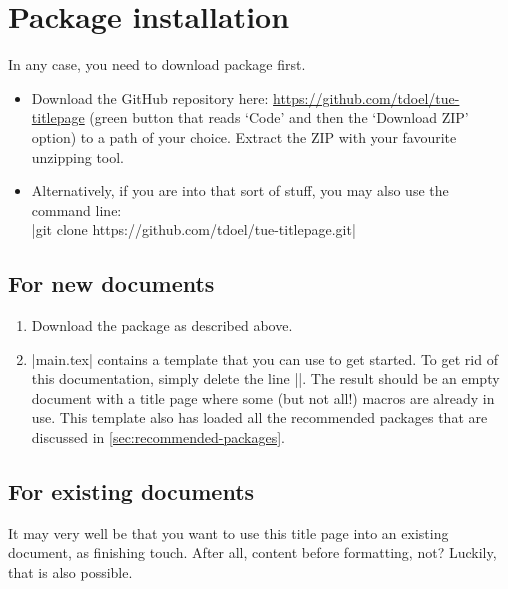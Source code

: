 \section{Package installation}
In any case, you need to download package first.
\begin{itemize}
  \item Download the GitHub repository here: \url{https://github.com/tdoel/tue-titlepage} (green button that reads `Code' and then the `Download ZIP' option) to a path of your choice. Extract the ZIP with your favourite unzipping tool.
  \item Alternatively, if you are into that sort of stuff, you may also use the command line:\\
  |git clone https://github.com/tdoel/tue-titlepage.git|
\end{itemize}

\subsection{For new documents}
\begin{enumerate}
  \item Download the package as described above.
  \item |main.tex| contains a template that you can use to get started. To get rid of this documentation, simply delete the line ||. The result should be an empty document with a title page where some (but not all!) macros are already in use. This template also has loaded all the recommended packages that are discussed in \cref{sec:recommended-packages}.
\end{enumerate}

\subsection{For existing documents}
It may very well be that you want to use this title page into an existing document, as finishing touch. After all, content before formatting, not? Luckily, that is also possible.


